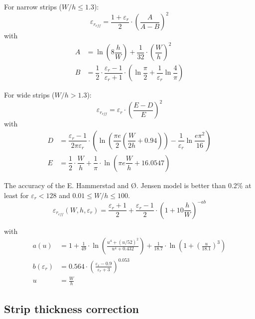 \documentclass[10pt]{report}
\begin{document}
For narrow strips ($W/h \le 1.3$):
\begin{equation}
\varepsilon_{r_{eff}} = \dfrac{1 + \varepsilon_r}{2}\cdot \left(\dfrac{A}{A - B}\right)^2
\end{equation}
with
\begin{align}
A &= \ln{\left(8\dfrac{h}{W}\right)} + \dfrac{1}{32}\cdot\left(\dfrac{W}{h}\right)^2\\
B &= \dfrac{1}{2}\cdot \dfrac{\varepsilon_r - 1}{\varepsilon_r + 1} \cdot\left(\ln{\dfrac{\pi}{2}} + \dfrac{1}{\varepsilon_r}\ln{\dfrac{4}{\pi}}\right)
\end{align}

For wide strips ($W/h > 1.3$):
\begin{equation}
\varepsilon_{r_{eff}} = \varepsilon_r\cdot\left(\dfrac{E - D}{E}\right)^2
\end{equation}
with
\begin{align}
D &= \dfrac{\varepsilon_r - 1}{2\pi \varepsilon_r}\cdot\left(\ln{\left(\dfrac{\pi e}{2}\left(\dfrac{W}{2h} + 0.94\right)\right)} - \dfrac{1}{\varepsilon_r} \ln{\dfrac{e\pi^{2}}{16}}\right)\\
E &= \dfrac{1}{2}\cdot\dfrac{W}{h} + \dfrac{1}{\pi}\cdot \ln{\left(\pi e \dfrac{W}{h} + 16.0547\right)}
\end{align}

The accuracy of the E. Hammerstad and {\O}. Jensen \cite{Hammerstad} model
is better than 0.2\% at least for $\varepsilon_r < 128$ and $0.01 \le
W/h \le 100$.
\begin{equation}
\label{eq:HandJErEff}
\varepsilon_{r_{eff}}\left(W, h, \varepsilon_r\right) = \frac{\varepsilon_{r} + 1}{2} + \frac{\varepsilon_{r} - 1}{2}\cdot\left(1 + 10\frac{h}{W}\right)^{-ab}
\end{equation}

with
\begin{align}
\label{eq:HandJa}
a\left(u\right) &= 1 + \frac{1}{49}\cdot\ln{\left(\frac{u^{4} + \left(u/52\right)^{2}}{u^{4} + 0.432}\right)} + \frac{1}{18.7}\cdot\ln{\left(1 + \left(\frac{u}{18.1}\right)^{3}\right)}\\
\label{eq:HandJb}
b\left(\varepsilon_r\right) &= 0.564\cdot\left(\frac{\varepsilon_{r} - 0.9}{\varepsilon_{r} + 3}\right)^{0.053}\\
u &= \frac{W}{h}
\end{align}

\subsection{Strip thickness correction}
\end{document}
